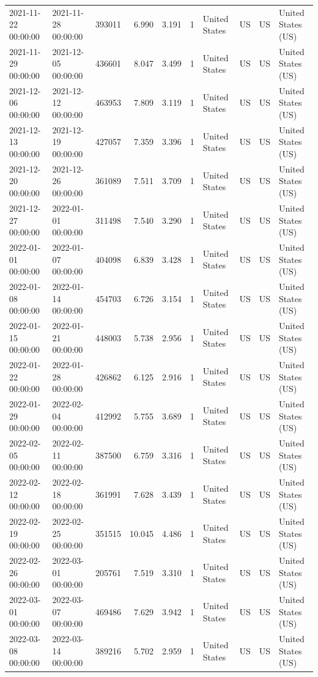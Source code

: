 \begin{tabular}{llrrrlllll}
2021-11-22 00:00:00 & 2021-11-28 00:00:00 & 393011 & 6.990 & 3.191 & 1 & United States & US & US & United States (US) \\
2021-11-29 00:00:00 & 2021-12-05 00:00:00 & 436601 & 8.047 & 3.499 & 1 & United States & US & US & United States (US) \\
2021-12-06 00:00:00 & 2021-12-12 00:00:00 & 463953 & 7.809 & 3.119 & 1 & United States & US & US & United States (US) \\
2021-12-13 00:00:00 & 2021-12-19 00:00:00 & 427057 & 7.359 & 3.396 & 1 & United States & US & US & United States (US) \\
2021-12-20 00:00:00 & 2021-12-26 00:00:00 & 361089 & 7.511 & 3.709 & 1 & United States & US & US & United States (US) \\
2021-12-27 00:00:00 & 2022-01-01 00:00:00 & 311498 & 7.540 & 3.290 & 1 & United States & US & US & United States (US) \\
2022-01-01 00:00:00 & 2022-01-07 00:00:00 & 404098 & 6.839 & 3.428 & 1 & United States & US & US & United States (US) \\
2022-01-08 00:00:00 & 2022-01-14 00:00:00 & 454703 & 6.726 & 3.154 & 1 & United States & US & US & United States (US) \\
2022-01-15 00:00:00 & 2022-01-21 00:00:00 & 448003 & 5.738 & 2.956 & 1 & United States & US & US & United States (US) \\
2022-01-22 00:00:00 & 2022-01-28 00:00:00 & 426862 & 6.125 & 2.916 & 1 & United States & US & US & United States (US) \\
2022-01-29 00:00:00 & 2022-02-04 00:00:00 & 412992 & 5.755 & 3.689 & 1 & United States & US & US & United States (US) \\
2022-02-05 00:00:00 & 2022-02-11 00:00:00 & 387500 & 6.759 & 3.316 & 1 & United States & US & US & United States (US) \\
2022-02-12 00:00:00 & 2022-02-18 00:00:00 & 361991 & 7.628 & 3.439 & 1 & United States & US & US & United States (US) \\
2022-02-19 00:00:00 & 2022-02-25 00:00:00 & 351515 & 10.045 & 4.486 & 1 & United States & US & US & United States (US) \\
2022-02-26 00:00:00 & 2022-03-01 00:00:00 & 205761 & 7.519 & 3.310 & 1 & United States & US & US & United States (US) \\
2022-03-01 00:00:00 & 2022-03-07 00:00:00 & 469486 & 7.629 & 3.942 & 1 & United States & US & US & United States (US) \\
2022-03-08 00:00:00 & 2022-03-14 00:00:00 & 389216 & 5.702 & 2.959 & 1 & United States & US & US & United States (US) \\

\end{tabular}
